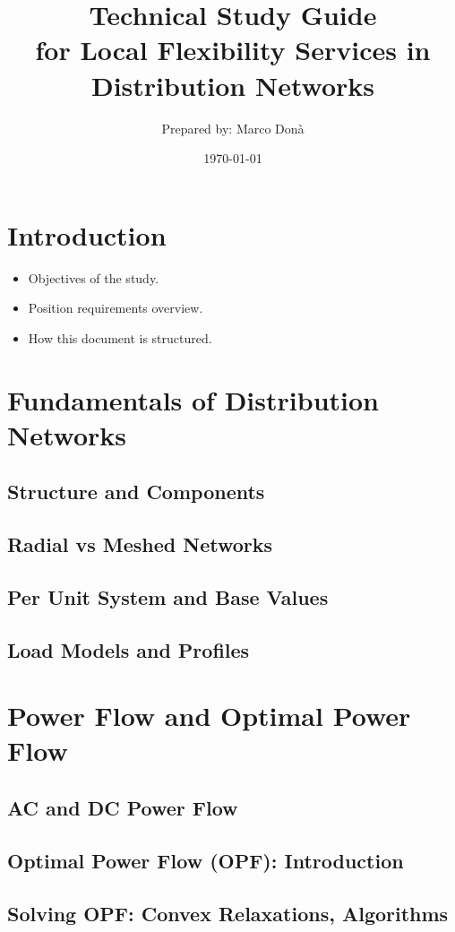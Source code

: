 \documentclass[11pt]{article}
\title{Technical Study Guide\\for Local Flexibility Services in Distribution Networks}
\author{Prepared by: Marco Donà}
\date{\today}
\begin{document}
	
	\maketitle
	\tableofcontents
	\newpage
	
	\section{Introduction}
	\begin{itemize}
		\item Objectives of the study.
		\item Position requirements overview.
		\item How this document is structured.
	\end{itemize}
	
	\section{Fundamentals of Distribution Networks}
	\subsection{Structure and Components}
	\subsection{Radial vs Meshed Networks}
	\subsection{Per Unit System and Base Values}
	\subsection{Load Models and Profiles}
	
	\section{Power Flow and Optimal Power Flow}
	\subsection{AC and DC Power Flow}
	\subsection{Optimal Power Flow (OPF): Introduction}
	\subsection{Solving OPF: Convex Relaxations, Algorithms}
\end{document}

